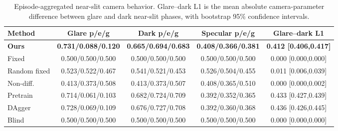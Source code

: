 \begin{table}[t]
\centering
\small
\begin{tabular}{lcccc}
\toprule
Method & Glare p/e/g & Dark p/e/g & Specular p/e/g & Glare--dark L1 \\
\midrule
\textbf{Ours} & \textbf{0.731/0.088/0.120} & \textbf{0.665/0.694/0.683} & \textbf{0.408/0.366/0.381} & \textbf{0.412 [0.406,0.417]} \\
Fixed & 0.500/0.500/0.500 & 0.500/0.500/0.500 & 0.500/0.500/0.500 & 0.000 [0.000,0.000] \\
Random fixed & 0.523/0.522/0.467 & 0.541/0.521/0.453 & 0.526/0.504/0.455 & 0.011 [0.006,0.039] \\
Non-diff. & 0.413/0.373/0.508 & 0.413/0.373/0.507 & 0.408/0.365/0.510 & 0.000 [0.000,0.002] \\
Pretrain & 0.714/0.061/0.103 & 0.682/0.724/0.709 & 0.392/0.352/0.365 & 0.433 [0.427,0.439] \\
DAgger & 0.728/0.069/0.109 & 0.676/0.727/0.708 & 0.392/0.360/0.368 & 0.436 [0.426,0.445] \\
Blind & 0.500/0.500/0.500 & 0.500/0.500/0.500 & 0.500/0.500/0.500 & 0.000 [0.000,0.000] \\
\bottomrule
\end{tabular}
\caption{Episode-aggregated near-slit camera behavior. Glare--dark L1 is the mean absolute camera-parameter difference between glare and dark near-slit phases, with bootstrap 95\% confidence intervals.}
\label{tab:journal_camera_response}
\end{table}
